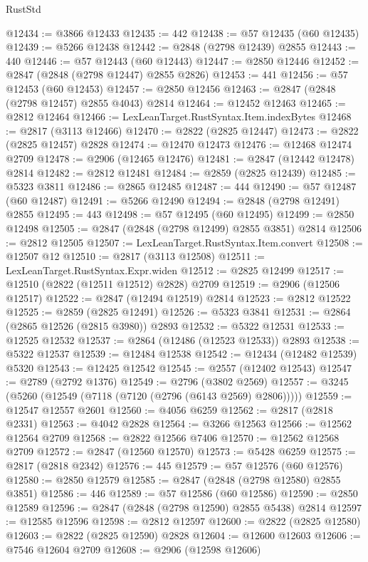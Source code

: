 \begin{lexlean}{RustStd}
\begin{coremodule}
@12434 := @3866 @12433
@12435 := 442
@12438 := @57 @12435 (@60 @12435)
@12439 := @5266 @12438
@12442 := @2848 (@2798 @12439) @2855
@12443 := 440
@12446 := @57 @12443 (@60 @12443)
@12447 := @2850 @12446
@12452 := @2847 (@2848 (@2798 @12447) @2855 @2826)
@12453 := 441
@12456 := @57 @12453 (@60 @12453)
@12457 := @2850 @12456
@12463 := @2847 (@2848 (@2798 @12457) @2855 @4043) @2814
@12464 := @12452 @12463
@12465 := @2812 @12464
@12466 := LexLeanTarget.RustSyntax.Item.indexBytes
@12468 := @2817 (@3113 @12466)
@12470 := @2822 (@2825 @12447)
@12473 := @2822 (@2825 @12457) @2828
@12474 := @12470 @12473
@12476 := @12468 @12474 @2709
@12478 := @2906 (@12465 @12476)
@12481 := @2847 (@12442 @12478) @2814
@12482 := @2812 @12481
@12484 := @2859 (@2825 @12439)
@12485 := @5323 @3811
@12486 := @2865 @12485
@12487 := 444
@12490 := @57 @12487 (@60 @12487)
@12491 := @5266 @12490
@12494 := @2848 (@2798 @12491) @2855
@12495 := 443
@12498 := @57 @12495 (@60 @12495)
@12499 := @2850 @12498
@12505 := @2847 (@2848 (@2798 @12499) @2855 @3851) @2814
@12506 := @2812 @12505
@12507 := LexLeanTarget.RustSyntax.Item.convert
@12508 := @12507 @12
@12510 := @2817 (@3113 @12508)
@12511 := LexLeanTarget.RustSyntax.Expr.widen
@12512 := @2825 @12499
@12517 := @12510 (@2822 (@12511 @12512) @2828) @2709
@12519 := @2906 (@12506 @12517)
@12522 := @2847 (@12494 @12519) @2814
@12523 := @2812 @12522
@12525 := @2859 (@2825 @12491)
@12526 := @5323 @3841
@12531 := @2864 (@2865 @12526 (@2815 @3980)) @2893
@12532 := @5322 @12531
@12533 := @12525 @12532
@12537 := @2864 (@12486 (@12523 @12533)) @2893
@12538 := @5322 @12537
@12539 := @12484 @12538
@12542 := @12434 (@12482 @12539) @5320
@12543 := @12425 @12542
@12545 := @2557 (@12402 @12543)
@12547 := @2789 (@2792 @1376)
@12549 := @2796 (@3802 @2569)
@12557 := @3245 (@5260 (@12549 (@7118 (@7120 (@2796 (@6143 @2569) @2806)))))
@12559 := @12547 @12557 @2601
@12560 := @4056 @6259
@12562 := @2817 (@2818 @2331)
@12563 := @4042 @2828
@12564 := @3266 @12563
@12566 := @12562 @12564 @2709
@12568 := @2822 @12566 @7406
@12570 := @12562 @12568 @2709
@12572 := @2847 (@12560 @12570)
@12573 := @5428 @6259
@12575 := @2817 (@2818 @2342)
@12576 := 445
@12579 := @57 @12576 (@60 @12576)
@12580 := @2850 @12579
@12585 := @2847 (@2848 (@2798 @12580) @2855 @3851)
@12586 := 446
@12589 := @57 @12586 (@60 @12586)
@12590 := @2850 @12589
@12596 := @2847 (@2848 (@2798 @12590) @2855 @5438) @2814
@12597 := @12585 @12596
@12598 := @2812 @12597
@12600 := @2822 (@2825 @12580)
@12603 := @2822 (@2825 @12590) @2828
@12604 := @12600 @12603
@12606 := @7546 @12604 @2709
@12608 := @2906 (@12598 @12606)

\end{coremodule}
\end{lexlean}
